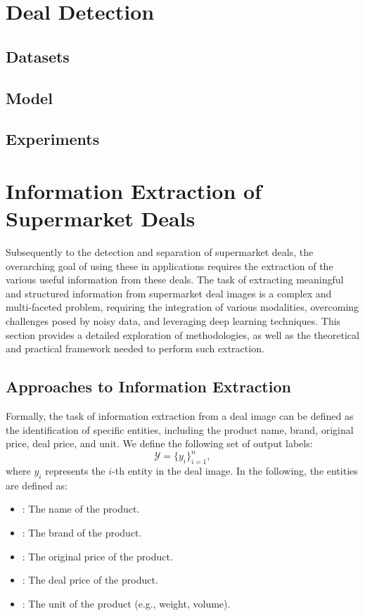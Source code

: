 \documentclass[11pt]{article}
\begin{document}
\section{Deal Detection}
    \subsection{Datasets}
    \subsection{Model}
    \subsection{Experiments}

\section{Information Extraction of Supermarket Deals}
Subsequently to the detection and separation of supermarket deals, the overarching goal of using these in applications requires the extraction of the various useful information from these deals. 
The task of extracting meaningful and structured information from supermarket deal images is a complex and multi-faceted problem, requiring the integration of various modalities, overcoming challenges posed by noisy data, and leveraging deep learning techniques. This section provides a detailed exploration of methodologies, as well as the theoretical and practical framework needed to perform such extraction.

\subsection{Approaches to Information Extraction}
Formally, the task of information extraction from a deal image can be defined as the identification of specific entities, including the product name, brand, original price, deal price, and unit. We define the following set of output labels:
\begin{equation}
\mathcal{Y} = \{y_{i}\}_{i=1}^{n},
\end{equation}
where $y_{i}$ represents the $i$-th entity in the deal image. In the following, the entities are defined as:
\begin{itemize}
    \item {}: The name of the product.
    \item {}: The brand of the product.
    \item {}: The original price of the product.
    \item {}: The deal price of the product.
    \item {}: The unit of the product (e.g., weight, volume).
\end{itemize}
\end{document}
